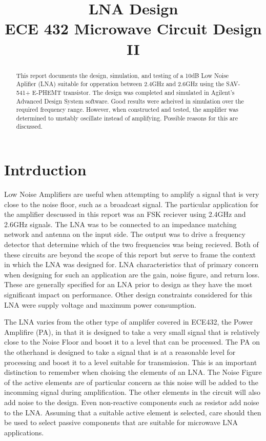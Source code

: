 \documentclass[conference]{IEEEtran}
\begin{document}
\title{LNA Design\\ECE 432 Microwave Circuit Design II}
\author{
}
\maketitle
\IEEEpeerreviewmaketitle

\begin{abstract}
This report documents the design, simulation, and testing of a 10dB Low Noise Aplifier (LNA) suitable for opperation between 2.4GHz and 2.6GHz using the SAV-541+ E-PHEMT transistor. The design was completed and simulated in Agilent's Advanced Design System software. Good results were acheived in simulation over the required frequency range. However, when constructed and tested, the amplifier was determined to unstably oscillate instead of amplifying. Possible reasons for this are discussed.
 \end{abstract}

\section{Intrduction}
Low Noise Amplifiers are useful when attempting to amplify a signal that is very close to the noise floor, such as a broadcast signal. The particular application for the amplifier descussed in this report was an FSK reciever using 2.4GHz and 2.6GHz signals. The LNA was to be connected to an impedance matching network and antenna on the input side. The output was to drive a frequency detector that determine which of the two frequencies was being recieved. Both of these circuits are beyond the scope of this report but serve to frame the context in which the LNA was designed for. LNA characteristics that of primary concern when designing for such an application are the gain, noise figure, and return loss. These are generally specified for an LNA prior to design as they have the most significant impact on performance. Other design constraints considered for this LNA were supply voltage and maximum power consumption.

The LNA varies from the other type of amplifer covered in ECE432, the Power Amplifire (PA), in that it is designed to take a very small signal that is relatively close to the Noise Floor and boost it to a level that can be processed. The PA on the otherhand is designed to take a signal that is at a reasonable level for processing and boost it to a level suitable for transmission. This is an important distinction to remember when choising the elements of an LNA. The Noise Figure of the active elements are of particular concern as this noise will be added to the incomming signal during amplification. The other elements in the circuit will also add noise to the design. Even non-reactive components such as resistor add noise to the LNA. Assuming that a suitable active element is selected, care should then be used to select passive components that are suitable for microwave LNA applications.
\end{document}
